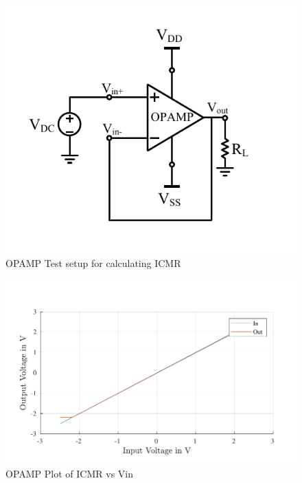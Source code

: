 \begin{figure} [H]
\centering
\includegraphics[scale=1]{Figures/Test_Benches/OPAMP/OPAMP_ICMR.pdf}
\caption{OPAMP Test setup for calculating ICMR}
\end{figure}

\begin{figure} [H]
\centering
\includegraphics[scale=1]{Figures/Plots/OPAMP_ICMR.pdf}
\caption{OPAMP Plot of ICMR vs Vin}
\end{figure}

